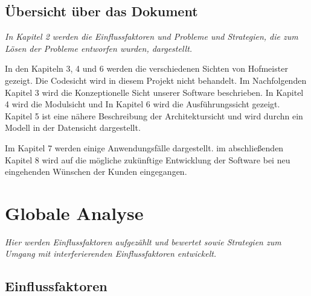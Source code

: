 \documentclass[enabledeprecatedfontcommands,fontsize=12pt,paper=a4,twoside]{scrartcl}
\begin{document}
\subsection{Übersicht über das Dokument}

{ \em In Kapitel 2 werden die Einflussfaktoren und Probleme und Strategien, die zum Lösen der Probleme entworfen wurden, dargestellt.

In den Kapiteln 3, 4 und 6 werden die verschiedenen Sichten von Hofmeister gezeigt. Die Codesicht wird in diesem Projekt nicht behandelt.
Im Nachfolgenden Kapitel 3 wird die Konzeptionelle Sicht unserer Software beschrieben. In Kapitel 4 wird die Modulsicht und In Kapitel 6 wird die Ausführungssicht gezeigt. Kapitel 5 ist eine nähere Beschreibung der Architektursicht und wird durchn ein Modell in der Datensicht dargestellt.

Im Kapitel 7 werden einige Anwendungsfälle dargestellt. im abschließenden Kapitel 8 wird auf die mögliche zukünftige Entwicklung der Software bei neu eingehenden Wünschen der Kunden eingegangen.

}



\section{Globale Analyse}
\label{sec:globale_analyse}

{\it Hier werden Einflussfaktoren aufgezählt und bewertet sowie Strategien
zum Umgang mit interferierenden Einflussfaktoren entwickelt.}

\subsection{Einflussfaktoren}


\end{document}
